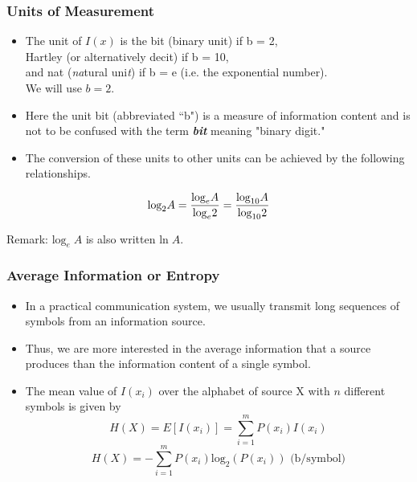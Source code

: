 \documentclass[a4]{beamer}
\begin{document}
\begin{frame}
\frametitle{Units of Measurement}
\begin{itemize}
\item The unit of $I(x)$ is the bit (binary unit) if b = 2, \\ Hartley (or alternatively decit) if b = 10,\\ and nat (\emph{na}tural uni\emph{t}) if b = e (i.e. the exponential number).  \\ We will use $b = 2$. \item Here the unit bit (abbreviated ``b") is a measure of information content and is not to be confused with the term \emph{\textbf{bit}} meaning "binary digit." \item The conversion of these
units to other units can be achieved by the following relationships.
\end{itemize}

\[ \mbox{log}_2A = {\mbox{log}_e A \over \mbox{log} _e 2}   = {\mbox{log}_{10} A \over \mbox{log}_{10} 2}  \]

Remark: $ \mbox{log}_e\; A $ is also written $\mbox{ln}\; A$.
\end{frame}

\begin{frame}
\frametitle{Average Information or Entropy}
\begin{itemize}
\item In a practical communication system, we usually transmit long sequences of symbols from an
information source. \item Thus, we are more interested in the average information that a source produces
than the information content of a single symbol.
\item The mean value of $ I(x_i)$ over the alphabet of source X with $n$ different symbols is given by
\[ H(X) = E[I(x_i)] = \sum^m_{i=1} P(x_i)I(x_i) \]
\[ H(X) =  - \sum^m_{i=1} P(x_i)\mbox{log}_2( P(x_i) ) \mbox{        (b/symbol)}\]
\end{itemize}
\end{frame}
\end{document}
